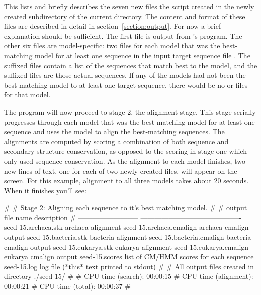 This lists and briefly describes the seven new files the script created
in the newly created  subdirectory of the current directory.
The content and format of these files are described
in detail in section~\ref{section:output}. For now a brief explanation
should be sufficient. The first file  is output from
's  program. The other six files are
model-specific: two files for each model that was the best-matching
model for at least one sequence in the input target sequence file
. The  suffixed files contain a list
of the sequences that match best to the model, and the 
suffixed files are those actual sequences. If any of the models had
not been the best-matching model to at least one target sequence,
there would be no  or  files for that
model.

The program will now proceed to stage 2, the alignment stage. This
stage serially progresses through each model that was the
best-matching model for at least one sequence and uses the model to
align the best-matching sequences. The alignments are computed by scoring
a combination of both sequence and secondary structure conservation,
as opposed to the scoring in stage one which only used sequence
conservation. As the alignment to each model finishes, two new lines
of text, one for each of two newly created files, will appear on the
screen. For this example, alignment to all three models takes about 20
seconds. When it finishes you'll see:

\newpage

\begin{sreoutput}
#
# Stage 2: Aligning each sequence to it's best matching model.
#
# output file name            description
# --------------------------  -------------------------------------------
  seed-15.archaea.stk         archaea alignment
  seed-15.archaea.cmalign     archaea cmalign output
  seed-15.bacteria.stk        bacteria alignment
  seed-15.bacteria.cmalign    bacteria cmalign output
  seed-15.eukarya.stk         eukarya alignment
  seed-15.eukarya.cmalign     eukarya cmalign output
  seed-15.scores              list of CM/HMM scores for each sequence
  seed-15.log                 log file (*this* text printed to stdout)
#
# All output files created in directory ./seed-15/
#
# CPU time (search):     00:00:15
# CPU time (alignment):  00:00:21
# CPU time (total):      00:00:37
#
\end{sreoutput}

